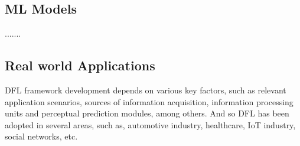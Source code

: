 \subsection{\gls{ML} Models}
\label{sub:ml_models}

.......

\subsection{Real world Applications}
\label{sub:real_worl_applications}

DFL framework development depends on various key factors, such as relevant application scenarios, sources of information acquisition, information processing units and perceptual prediction modules, among others. And so DFL has been adopted in several areas, such as, automotive industry, healthcare, IoT industry, social networks, etc.

